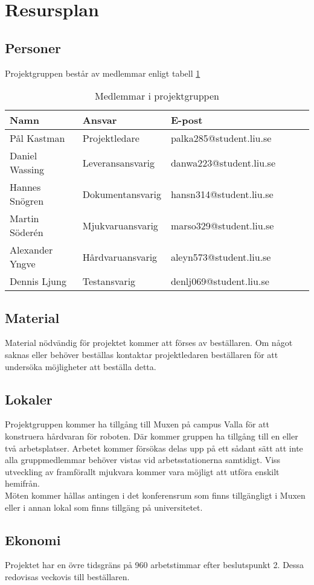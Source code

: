 \section{Resursplan}

\subsection{Personer}
Projektgruppen består av medlemmar enligt tabell \ref{projektplan:resursplan-personer}
\begin{table}[h]
	\centering
		\begin{tabularx}{\textwidth}{| l | l | X | l | l | l |}
			\hline
			\textbf{Namn} & \textbf{Ansvar} & \textbf{E-post} \\
			\hline
			{Pål Kastman} & {Projektledare} & {palka285@student.liu.se} \\\hline
			{Daniel Wassing} & {Leveransansvarig} & {danwa223@student.liu.se} \\\hline
			{Hannes Snögren} & {Dokumentansvarig} & {hansn314@student.liu.se} \\\hline
			{Martin Söderén} & {Mjukvaruansvarig} & {marso329@student.liu.se} \\\hline
			{Alexander Yngve} & {Hårdvaruansvarig} & {aleyn573@student.liu.se} \\\hline
			{Dennis Ljung} & {Testansvarig} & {denlj069@student.liu.se} \\\hline
		\end{tabularx}
	\caption{Medlemmar i projektgruppen} \label{projektplan:resursplan-personer}
\end{table}

\subsection{Material}
Material nödvändig för projektet kommer att förses av beställaren. Om något saknas eller behöver beställas kontaktar projektledaren beställaren för att undersöka möjligheter att beställa detta.

\subsection{Lokaler}
Projektgruppen kommer ha tillgång till Muxen på campus Valla för att konstruera hårdvaran för roboten. Där kommer gruppen ha tillgång till en eller två arbetsplatser. Arbetet kommer försökas delas upp på ett sådant sätt att inte alla gruppmedlemmar behöver vistas vid arbetsstationerna samtidigt. Viss utveckling av framförallt mjukvara kommer vara möjligt att utföra enskilt hemifrån. \\
Möten kommer hållas antingen i det konferensrum som finns tillgängligt i Muxen eller i annan lokal som finns tillgäng på universitetet.

\subsection{Ekonomi}
Projektet har en övre tidsgräns på 960 arbetstimmar efter beslutspunkt 2. Dessa redovisas veckovis till beställaren.